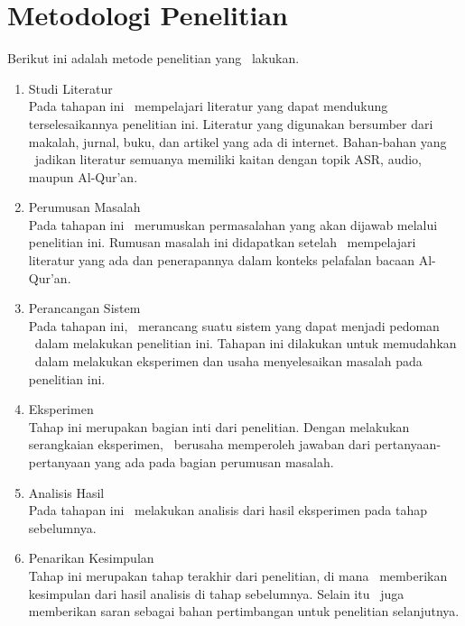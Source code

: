 \section{Metodologi Penelitian}
Berikut ini adalah metode penelitian yang \saya~lakukan.
\begin{enumerate}
	\item Studi Literatur\\
	Pada tahapan ini \saya~mempelajari literatur yang dapat mendukung terselesaikannya penelitian ini. Literatur yang digunakan bersumber dari makalah, jurnal, buku, dan  artikel yang ada di internet. Bahan-bahan yang \saya~jadikan literatur semuanya memiliki kaitan dengan topik ASR, audio, maupun Al-Qur'an.
	
	\item Perumusan Masalah \\
	Pada tahapan ini \saya~merumuskan permasalahan yang akan dijawab melalui penelitian ini. Rumusan masalah ini didapatkan setelah \saya~mempelajari literatur yang ada dan penerapannya dalam konteks pelafalan bacaan Al-Qur'an. 
	
	\item Perancangan Sistem \\
	Pada tahapan ini, \saya~merancang suatu sistem yang dapat menjadi pedoman \saya~dalam melakukan penelitian ini. Tahapan ini dilakukan untuk memudahkan \saya~dalam melakukan eksperimen dan usaha menyelesaikan masalah pada penelitian ini.
		
	\item Eksperimen \\
	Tahap ini merupakan bagian inti dari penelitian. Dengan melakukan serangkaian eksperimen, \saya~berusaha memperoleh jawaban dari pertanyaan-pertanyaan yang ada pada bagian perumusan masalah.
	
	\item Analisis Hasil \\
	Pada tahapan ini \saya~melakukan analisis dari hasil eksperimen pada tahap sebelumnya.
		
	\item Penarikan Kesimpulan \\
	Tahap ini merupakan tahap terakhir dari penelitian, di mana \saya~memberikan kesimpulan dari hasil analisis di tahap sebelumnya. Selain itu \saya~juga memberikan saran sebagai bahan pertimbangan untuk penelitian selanjutnya.
\end{enumerate}

